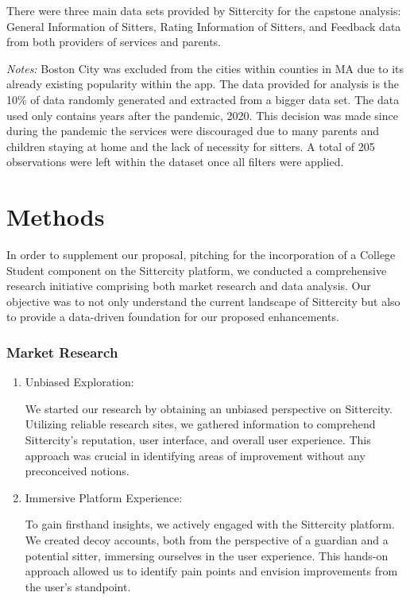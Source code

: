 \documentclass[12pt]{article}
\begin{document}
There were three main data sets provided by Sittercity for the capstone
analysis: General Information of Sitters, Rating Information of Sitters,
and Feedback data from both providers of services and parents.

\emph{Notes:} Boston City was excluded from the cities within counties
in MA due to its already existing popularity within the app. The data
provided for analysis is the 10\% of data randomly generated and
extracted from a bigger data set. The data used only contains years
after the pandemic, 2020. This decision was made since during the
pandemic the services were discouraged due to many parents and children
staying at home and the lack of necessity for sitters. A total of 205
observations were left within the dataset once all filters were applied.

\hypertarget{methods}{%
\section{Methods}\label{methods}}

In order to supplement our proposal, pitching for the incorporation of a
College Student component on the Sittercity platform, we conducted a
comprehensive research initiative comprising both market research and
data analysis. Our objective was to not only understand the current
landscape of Sittercity but also to provide a data-driven foundation for
our proposed enhancements.

\hypertarget{market-research}{%
\subsubsection{Market Research}\label{market-research}}

\begin{enumerate}
\def\labelenumi{\arabic{enumi}.}
\item
  Unbiased Exploration:

  We started our research by obtaining an unbiased perspective on
  Sittercity. Utilizing reliable research sites, we gathered information
  to comprehend Sittercity's reputation, user interface, and overall
  user experience. This approach was crucial in identifying areas of
  improvement without any preconceived notions.
\item
  Immersive Platform Experience:

  To gain firsthand insights, we actively engaged with the Sittercity
  platform. We created decoy accounts, both from the perspective of a
  guardian and a potential sitter, immersing ourselves in the user
  experience. This hands-on approach allowed us to identify pain points
  and envision improvements from the user's standpoint.
\end{enumerate}
\end{document}
